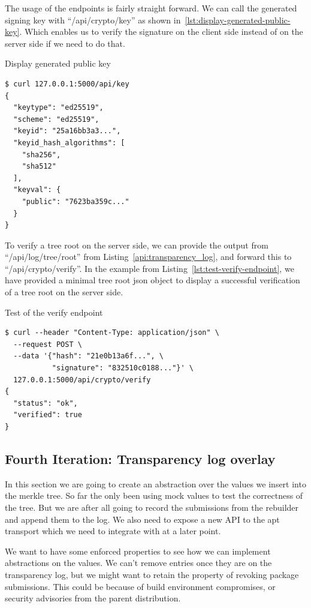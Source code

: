 \documentclass[../Main/thesis.tex]{subfiles}
\begin{document}
The usage of the endpoints is fairly straight forward. We can call the generated
signing key with ``/api/crypto/key'' as shown
in~\ref{lst:display-generated-public-key}. Which enables us to verify the
signature on the client side instead of on the server side if we need to do
that.

\begin{listing}[H]
\caption{Display generated public key}
\label{lst:display-generated-public-key}
\begin{verbatim}
$ curl 127.0.0.1:5000/api/key
{
  "keytype": "ed25519",
  "scheme": "ed25519",
  "keyid": "25a16bb3a3...",
  "keyid_hash_algorithms": [
    "sha256",
    "sha512"
  ],
  "keyval": {
    "public": "7623ba359c..."
  }
}
\end{verbatim}
\end{listing}

To verify a tree root on the server side, we can provide the output from
``/api/log/tree/root'' from Listing~\ref{api:transparency_log}, and forward this
to ``/api/crypto/verify''. In the example from
Listing~\ref{lst:test-verify-endpoint}, we have provided a minimal tree root
json object to display a successful verification of a tree root on the server
side.

\begin{listing}[H]
\caption{Test of the verify endpoint}
\label{lst:test-verify-endpoint}
\begin{verbatim}
$ curl --header "Content-Type: application/json" \
  --request POST \
  --data '{"hash": "21e0b13a6f...", \
           "signature": "832510c0188..."}' \
  127.0.0.1:5000/api/crypto/verify
{
  "status": "ok",
  "verified": true
}
\end{verbatim}
\end{listing}


\subsection{Fourth Iteration: Transparency log overlay}%
\label{sub:transparency_overlay}
In this section we are going to create an abstraction over the values we insert
into the merkle tree. So far the only been using mock values to test the
correctness of the tree. But we are after all going to record the submissions
from the rebuilder and append them to the log. We also need to expose a new API
to the apt transport which we need to integrate with at a later point.

We want to have some enforced properties to see how we can implement
abstractions on the values. We can't remove entries once they are on the
transparency log, but we might want to retain the property of revoking package
submissions. This could be because of build environment compromises, or security
advisories from the parent distribution.
\end{document}
